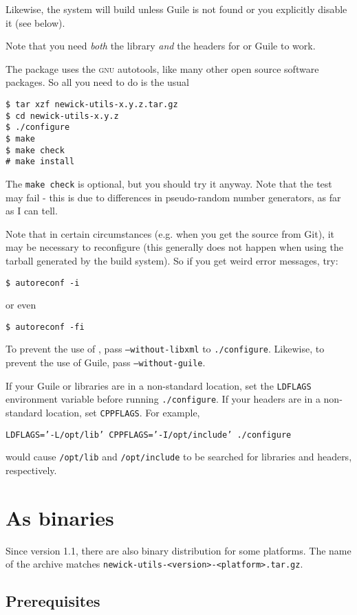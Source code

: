 Likewise, the system will build \sched{} unless Guile is
not found or you explicitly disable it (see below).

Note that you need \emph{both} the library \emph{and} the headers for \libxml{}
or Guile to work.

\noindent{}The package uses the \textsc{gnu} autotools, like many other open source software packages. So all you need to do is the usual
\begin{verbatim}
$ tar xzf newick-utils-x.y.z.tar.gz
$ cd newick-utils-x.y.z
$ ./configure
$ make
$ make check
# make install
\end{verbatim}
The \texttt{make check} is optional, but you should try it anyway. Note that
the \gen{} test may fail - this is due to differences in pseudo-random number
generators, as far as I can tell.

Note that in certain circumstances (e.g. when you get the source from Git), it may be necessary to reconfigure (this generally does not happen when using the tarball generated by the build system). So if you get weird error messages, try:

\texttt{\$ autoreconf -i}

or even

\texttt{\$ autoreconf -fi}

\noindent{}To prevent the use of \libxml, pass \texttt{--without-libxml} to
\texttt{./configure}. Likewise, to prevent the use of Guile, pass
\texttt{--without-guile}. 

If your Guile or \libxml{} libraries are in a non-standard location, set the
\texttt{LDFLAGS} environment variable before running \texttt{./configure}. If
your headers are in a non-standard location, set \texttt{CPPFLAGS}. For example,

\texttt{LDFLAGS='-L/opt/lib' CPPFLAGS='-I/opt/include' ./configure}

would cause \texttt{/opt/lib} and \texttt{/opt/include} to be searched for
libraries and headers, respectively.

\section{As binaries}

Since version 1.1, there are also binary distribution for some platforms. The
name of the archive matches \texttt{newick-utils-<version>-<platform>.tar.gz}.

\subsection{Prerequisites}


